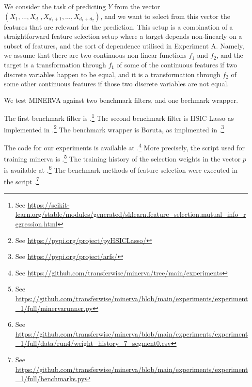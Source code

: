 We consider the task of predicting $Y$ from the vector 
$(X_1, \dots, X_{d_1}, X_{d_1 + 1}, \dots, X_{d_1 + d_2})$,
and 
we want to select 
from this vector 
the features that are relevant for the prediction.
This setup is a combination of a 
straightforward feature selection setup 
where a target depends non-linearly on a subset of features,
and 
the sort of dependence utilised in Experiment A.
Namely,
we assume that 
there are two continuous non-linear functions $f_1$ and $f_2$,
and
the target is a transformation through $f_1$
of some of the continuous features if two discrete  variables happen to be equal,
and it is a transformation through $f_2$
of some other continuous features if those two discrete variables are not equal. 

We test 
MINERVA
against two benchmark filters, 
and one bechmark wrapper.

The first benchmark filter is 
.\footnote{
See
\url{https://scikit-learn.org/stable/modules/generated/sklearn.feature\_selection.mutual\_info\_regression.html}
}
The second benchmark filter is
HSIC Lasso
as implemented in 
.\footnote{
See \url{https://pypi.org/project/pyHSICLasso/}
}
The benchmark wrapper is Boruta,
as implmented in
.\footnote{
See
\url{https://pypi.org/project/arfs/}
}


The code for our experiments is available 
at
.\footnote{
	See
\url{https://github.com/transferwise/minerva/tree/main/experiments}
}
More precisely, 
the script used for training minerva is
.\footnote{
	See
\url{https://github.com/transferwise/minerva/blob/main/experiments/experiment\_1/full/minervarunner.py}
}
The training history of the 
selection weights
in the vector $p$
is available at
.\footnote{
	See
\url{https://github.com/transferwise/minerva/blob/main/experiments/experiment\_1/full/data/run4/weight\_history\_7\_segment0.csv}
}
The benchmark methods of feature selection 
were
executed
in the script
.\footnote{
	See
\url{https://github.com/transferwise/minerva/blob/main/experiments/experiment\_1/full/benchmarks.py}
}



